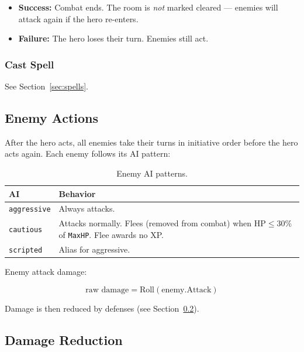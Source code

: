 \documentclass[a4paper,10pt]{article}
\newcommand{\field}[1]{\texttt{#1}}
\begin{document}
\begin{itemize}[nosep]
  \item \textbf{Success:} Combat ends. The room is \emph{not} marked cleared
        --- enemies will attack again if the hero re-enters.
  \item \textbf{Failure:} The hero loses their turn. Enemies still act.
\end{itemize}

\subsubsection{Cast Spell}

See Section~\ref{sec:spells}.

\subsection{Enemy Actions}

After the hero acts, all enemies take their turns in initiative order
before the hero acts again. Each enemy follows its AI pattern:

\begin{table}[h]
\centering
\begin{tabular}{@{}lp{9cm}@{}}
\toprule
\textbf{AI} & \textbf{Behavior} \\
\midrule
\texttt{aggressive} & Always attacks. \\
\texttt{cautious}   & Attacks normally. Flees (removed from combat) when
                       $\text{HP} \leq 30\%$ of \field{MaxHP}. Flee awards
                       no XP. \\
\texttt{scripted}    & Alias for aggressive. \\
\bottomrule
\end{tabular}
\caption{Enemy AI patterns.}
\end{table}

Enemy attack damage:

\[
  \text{raw damage} = \text{Roll}(\text{enemy.Attack})
\]

Damage is then reduced by defenses (see Section~\ref{sec:armor}).

\subsection{Damage Reduction}
\label{sec:armor}
\end{document}
